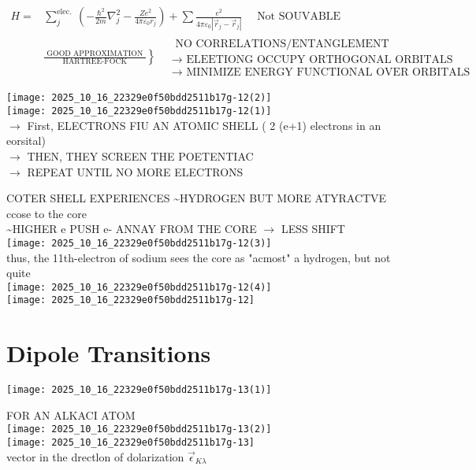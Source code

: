 $$
\begin{aligned}
H= & \sum_{j}^{\text {elec. }}\left(-\frac{\hbar^{2}}{2 m} \nabla_{j}^{2}-\frac{Z e^{2}}{4 \pi \varepsilon_{0} r_{j}}\right)+\sum \frac{e^{2}}{4 \pi \varepsilon_{0}\left|\vec{r}_{j}-\vec{r}_{j}\right|} \quad \text { Not SOUVABLE } \\
& \left.\frac{\text { GOOD APPROXIMATION }}{\text { HARTREE-FOCK }}\right\} \quad \begin{array}{l}
\text { NO CORRELATIONS/ENTANGLEMENT } \\
\rightarrow \text { ELEETIONG OCCUPY ORTHOGONAL ORBITALS } \\
\rightarrow \text { MINIMIZE ENERGY FUNCTIONAL OVER ORBITALS }
\end{array}
\end{aligned}
$$

\texttt{[image: 2025\_10\_16\_22329e0f50bdd2511b17g-12(2)]}\\
\texttt{[image: 2025\_10\_16\_22329e0f50bdd2511b17g-12(1)]}\\
$\rightarrow$ First, ELECTRONS FIU AN ATOMIC SHELL ( 2 (e+1) electrons in an eorsital)\\
$\rightarrow$ THEN, THEY SCREEN THE POETENTIAC\\
$\rightarrow$ REPEAT UNTIL NO MORE ELECTRONS

COTER SHELL EXPERIENCES \~{}HYDROGEN BUT MORE ATYRACTVE ccose to the core\\
\~{}HIGHER e PUSH e- ANNAY FROM THE CORE $\rightarrow$ LESS SHIFT\\
\texttt{[image: 2025\_10\_16\_22329e0f50bdd2511b17g-12(3)]}\\
thus, the 11th-electron of sodium sees the core as "acmost" a hydrogen, but not quite\\
\texttt{[image: 2025\_10\_16\_22329e0f50bdd2511b17g-12(4)]}\\
\texttt{[image: 2025\_10\_16\_22329e0f50bdd2511b17g-12]}

\section*{Dipole Transitions}
\begin{center}
\texttt{[image: 2025\_10\_16\_22329e0f50bdd2511b17g-13(1)]}
\end{center}

FOR AN ALKACI ATOM\\
\texttt{[image: 2025\_10\_16\_22329e0f50bdd2511b17g-13(2)]}\\
\texttt{[image: 2025\_10\_16\_22329e0f50bdd2511b17g-13]}\\
vector in the drectlon of dolarization $\vec{\epsilon}_{K \lambda}$

